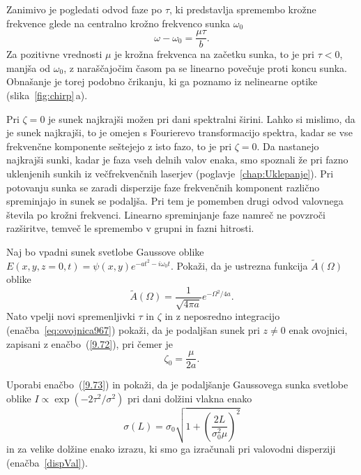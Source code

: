Zanimivo je pogledati odvod faze po $\tau$, ki predstavlja spremembo krožne
frekvence glede na centralno krožno frekvenco sunka $\omega_{0}$
\begin{equation}
\omega-\omega_{0}=\frac{\mu\tau}{b}.
\label{9.74}
\end{equation}
Za pozitivne vrednosti $\mu$ je krožna frekvenca na začetku sunka,
to je pri $\tau<0$, manjša od $\omega_0$, z naraščajočim časom pa se 
linearno povečuje proti koncu sunka. Obnašanje je torej podobno črikanju, 
ki ga poznamo iz nelinearne optike (slika~\ref{fig:chirp}\,a). 

\begin{remark}
Pri $\zeta=0$ je sunek najkrajši možen pri dani spektralni
širini. Lahko si mislimo, da je sunek najkrajši,
to je omejen s Fourierevo transformacijo spektra, kadar se
vse frekvenčne komponente seštejejo z isto fazo, to je pri $\zeta=0$.
Da nastanejo najkrajši sunki, kadar je faza vseh delnih valov enaka,
smo spoznali že pri fazno uklenjenih sunkih iz večfrekvenčnih laserjev
(poglavje~\ref{chap:Uklepanje}).
Pri potovanju sunka se zaradi disperzije faze frekvenčnih komponent
različno spreminjajo in sunek se podaljša. Pri tem je pomemben  
drugi odvod valovnega števila po krožni frekvenci. Linearno spreminjanje faze 
namreč ne povzroči razširitve, temveč le spremembo v grupni in fazni hitrosti.
\end{remark}

\begin{definition}
\label{naloga:pulzdisperzija}
Naj bo vpadni sunek svetlobe Gaussove oblike $E(x,y, z=0, t) = 
\psi(x,y) e^{-at^2-i \omega_0 t}$. Pokaži, da je ustrezna funkcija
$\tilde{A}(\Omega)$ oblike
\begin{equation}
\tilde{A}(\Omega) = \frac{1}{\sqrt{4 \pi a}}e^{-\Omega^2/4a}.
\end{equation}
Nato vpelji novi spremenljivki $\tau$ in $\zeta$ in z neposredno 
integracijo (enačba~\ref{eq:ovojnica967}) pokaži, 
da je podaljšan sunek pri $z\neq 0$ enak ovojnici, 
zapisani z enačbo~(\ref{9.72}), pri čemer je
\begin{equation}
\zeta_0 = \frac{\mu}{2 a}.
\end{equation}
\end{definition}

\begin{definition}
Uporabi enačbo~(\ref{9.73}) in pokaži, da je podaljšanje Gaussovega 
sunka svetlobe oblike $I \propto \exp(-2\tau^2/\sigma^2)$
pri dani dolžini vlakna enako
\begin{equation}
\sigma (L) = \sigma_0\sqrt{1 + \left(\frac{2 L }{\sigma_0^2 \mu}\right)^2}
\end{equation}
in za velike dolžine enako izrazu, ki smo ga izračunali pri 
valovodni disperziji (enačba~\ref{dispVal}).
\end{definition}

